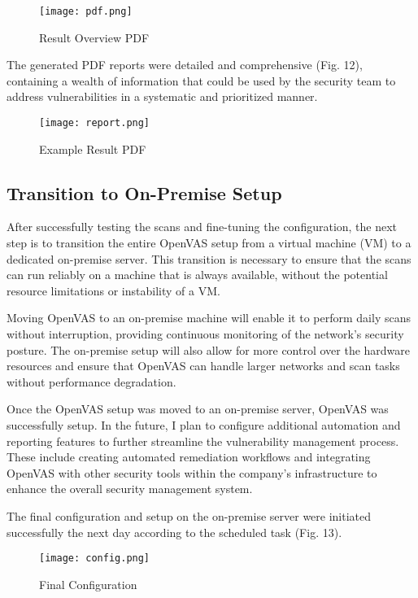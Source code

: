 \documentclass[twocolumn]{article}
\begin{document}
\begin{figure}[!htbp]
    \centering
    \texttt{[image: pdf.png]}
    \caption{Result Overview PDF}
\end{figure}

The generated PDF reports were detailed and comprehensive (Fig. 12), containing a wealth of information that could be used by the security team to address vulnerabilities in a systematic and prioritized manner.

\begin{figure}[!htbp]
    \centering
    \texttt{[image: report.png]}
    \caption{Example Result PDF}
\end{figure}

\subsection{Transition to On-Premise Setup}

After successfully testing the scans and fine-tuning the configuration, the next step is to transition the entire OpenVAS setup from a virtual machine (VM) to a dedicated on-premise server. This transition is necessary to ensure that the scans can run reliably on a machine that is always available, without the potential resource limitations or instability of a VM.

Moving OpenVAS to an on-premise machine will enable it to perform daily scans without interruption, providing continuous monitoring of the network's security posture. The on-premise setup will also allow for more control over the hardware resources and ensure that OpenVAS can handle larger networks and scan tasks without performance degradation.

Once the OpenVAS setup was moved to an on-premise server, OpenVAS was successfully setup. In the future, I plan to configure additional automation and reporting features to further streamline the vulnerability management process. These include creating automated remediation workflows and integrating OpenVAS with other security tools within the company's infrastructure to enhance the overall security management system.

The final configuration and setup on the on-premise server were initiated successfully the next day according to the scheduled task (Fig. 13).

\begin{figure}[h!]
    \centering
    \texttt{[image: config.png]}
    \caption{Final Configuration}
\end{figure}
\end{document}
